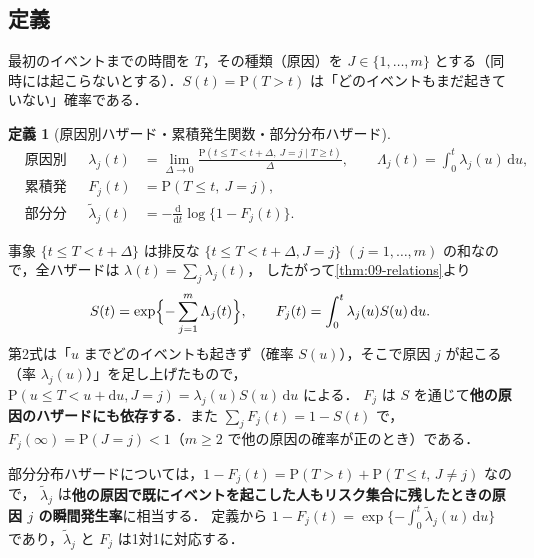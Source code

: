 \documentclass[a4paper,11pt,openany]{ltjsbook}
\newtheorem{teigi}{定義}[chapter]
\newcommand{\Prob}{\mathrm{P}}
\newcommand{\dd}{\mathrm{d}}
\begin{document}
\subsection{定義}\label{subsec:10-compete-def}
最初のイベントまでの時間を $T$，その種類（原因）を $J\in\{1,\dots,m\}$ とする（同時には起こらないとする）．$S(t)=\Prob(T>t)$ は「どのイベントもまだ起きていない」確率である．
\begin{teigi}[原因別ハザード・累積発生関数・部分分布ハザード]\label{def:10-compete}
\begin{align*}
&\text{原因別ハザード} & \lambda_j(t)&=\lim_{\Delta\to0}\frac{\Prob(t\le T<t+\Delta,\ J=j\mid T\ge t)}{\Delta},\qquad \Lambda_j(t)=\int_0^t\lambda_j(u)\,\dd u,\\
&\text{累積発生関数（CIF）} & F_j(t)&=\Prob(T\le t,\ J=j),\\
&\text{部分分布ハザード} & \tilde\lambda_j(t)&=-\frac{\dd}{\dd t}\log\{1-F_j(t)\}.
\end{align*}
\end{teigi}
事象 $\{t\le T<t+\Delta\}$ は排反な $\{t\le T<t+\Delta,J=j\}$ $(j=1,\dots,m)$ の和なので，全ハザードは $\lambda(t)=\sum_j\lambda_j(t)$，
したがって\cref{thm:09-relations}より
\begin{equation}
S(t)=\exp\Bigl\{-\sum_{j=1}^m\Lambda_j(t)\Bigr\},\qquad
F_j(t)=\int_0^t\lambda_j(u)S(u)\,\dd u .\label{eq:10-cif}
\end{equation}
第2式は「$u$ までどのイベントも起きず（確率 $S(u)$），そこで原因 $j$ が起こる（率 $\lambda_j(u)$）」を足し上げたもので，$\Prob(u\le T<u+\dd u,J=j)=\lambda_j(u)S(u)\,\dd u$ による．
$F_j$ は $S$ を通じて\textbf{他の原因のハザードにも依存する}．また $\sum_jF_j(t)=1-S(t)$ で，$F_j(\infty)=\Prob(J=j)<1$（$m\ge2$ で他の原因の確率が正のとき）である．

部分分布ハザードについては，$1-F_j(t)=\Prob(T>t)+\Prob(T\le t,\,J\ne j)$ なので，
$\tilde\lambda_j$ は\textbf{他の原因で既にイベントを起こした人もリスク集合に残したときの原因 $j$ の瞬間発生率}に相当する．
定義から $1-F_j(t)=\exp\{-\int_0^t\tilde\lambda_j(u)\,\dd u\}$ であり，$\tilde\lambda_j$ と $F_j$ は1対1に対応する．
\end{document}
